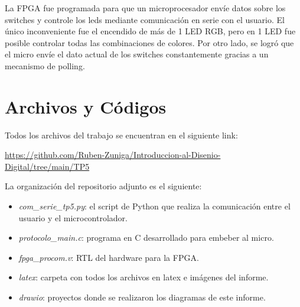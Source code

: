 La FPGA fue programada para que un microprocesador envíe datos sobre los switches y controle los leds mediante comunicación en serie con el usuario. El único inconveniente fue el encendido de más de 1 LED RGB, pero en 1 LED fue posible controlar todas las combinaciones de colores. Por otro lado, se logró que el micro envíe el dato actual de los switches constantemente gracias a un mecanismo de polling.

\appendix

\section{Archivos y Códigos} \label{appx:archivos}

Todos los archivos del trabajo se encuentran en el siguiente link:

\noindent
\url{https://github.com/Ruben-Zuniga/Introduccion-al-Disenio-Digital/tree/main/TP5}

La organización del repositorio adjunto es el siguiente:

\begin{itemize}
    \item \emph{com\_serie\_tp5.py}: el script de Python que realiza la comunicación entre el usuario y el microcontrolador.
    \item \emph{protocolo\_main.c}: programa en C desarrollado para embeber al micro.
    \item \emph{fpga\_procom.v}: RTL del hardware para la FPGA.
    \item \emph{latex}: carpeta con todos los archivos en latex e imágenes del informe.
    \item \emph{drawio}: proyectos donde se realizaron los diagramas de este informe.
\end{itemize}


%
%

